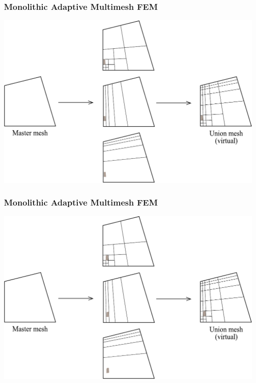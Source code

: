 \begin{frame}
  \frametitle{Monolithic Adaptive Multimesh FEM}
  \begin{center}
    \includegraphics[height=0.7\textheight]{multimesh/mm_6.pdf}
  \end{center}
\end{frame}

\begin{frame}
  \frametitle{Monolithic Adaptive Multimesh FEM}
  \begin{center}
    \includegraphics[height=0.7\textheight]{multimesh/mm_7.pdf}
  \end{center}
\end{frame}

